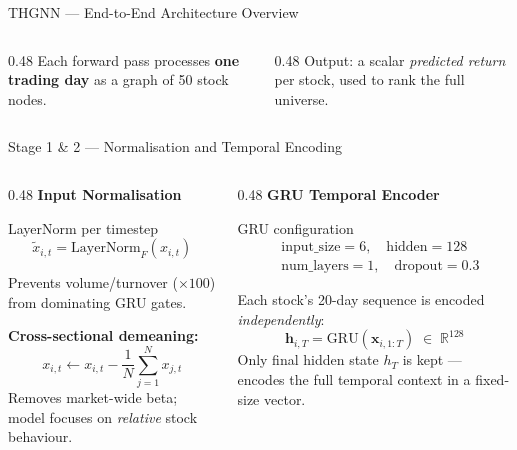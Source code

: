 \documentclass[aspectratio=169, 10pt]{beamer}
\newcommand{\myvec}[1]{\mathbf{#1}}
\begin{document}
\begin{frame}{THGNN — End-to-End Architecture Overview}
  \vspace{0.2cm}
  \begin{columns}[T]
    \begin{column}{0.48\textwidth}
      \small
      Each forward pass processes \textbf{one trading day} as a graph of
      50 stock nodes.
    \end{column}
    \begin{column}{0.48\textwidth}
      \small
      Output: a scalar \emph{predicted return} per stock, used to rank
      the full universe.
    \end{column}
  \end{columns}
\end{frame}

\begin{frame}{Stage 1 \& 2 — Normalisation and Temporal Encoding}
  \begin{columns}[T]
    \begin{column}{0.48\textwidth}
      \textbf{Input Normalisation}

      \begin{block}{LayerNorm per timestep}
        \vspace{-0.3em}
        \[
          \tilde{x}_{i,t} = \text{LayerNorm}_F(x_{i,t})
        \]
      \end{block}
      Prevents volume/turnover ($\times 100$) from dominating GRU gates.

      \vspace{0.3cm}
      \textbf{Cross-sectional demeaning:}
      \[
        x_{i,t} \leftarrow x_{i,t} - \frac{1}{N}\sum_{j=1}^N x_{j,t}
      \]
      Removes market-wide beta; model focuses on \emph{relative} stock behaviour.
    \end{column}
    \begin{column}{0.48\textwidth}
      \textbf{GRU Temporal Encoder}

      \begin{block}{GRU configuration}
        \vspace{-0.3em}
        \begin{align*}
          &\text{input\_size} = 6,\quad \text{hidden} = 128\\
          &\text{num\_layers} = 1,\quad \text{dropout} = 0.3
        \end{align*}
      \end{block}

      Each stock's 20-day sequence is encoded \emph{independently}:
      \[
        \myvec{h}_{i,T} = \text{GRU}(\myvec{x}_{i,1:T})
        \;\in\; \mathbb{R}^{128}
      \]
      Only final hidden state $h_T$ is kept — encodes the full temporal
      context in a fixed-size vector.
    \end{column}
  \end{columns}
\end{frame}
\end{document}
